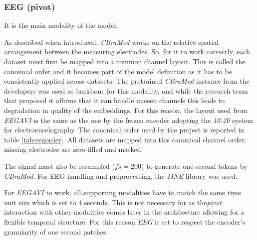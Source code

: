 \subsubsection{EEG (pivot)}
It is the main modality of the model.

As described when introduced, \textit{CBraMod} works on the relative spatial arrangement between the measuring electrodes.
So, for it to work correctly, each dataset must first be mapped into a common channel layout.
This is called the canonical order and it becomes part of the model definition as it has to be consistently applied across datasets.
The pretrained \textit{CBraMod} instance from the developers was used as backbone for this modality, and while the research team that proposed it affirms that it can handle unseen channels this leads to degradation in quality of the embeddings.
For this reason, the layout used from \textit{EEGAVI} is the same as the one by the frozen encoder adopting the \textit{10-20} system for electroencelography.
The canonical order used by the project is reported in table \ref{tab:eegorder}.
All datasets are mapped into this canonical channel order; missing electrodes are zero-filled and masked.

The signal must also be resampled ($fs=200$) to generate one-second tokens by \textit{CBraMod}.
For EEG handling and preprocessing, the \textit{MNE} \cite{} library was used.

For \textit{EEGAVI} to work, all supporting modalities have to match the same time unit size which is set to 4 seconds.
This is not necessary for  as the\textit{pivot} interaction with other modalities comes later in the architecture allowing for a flexible temporal structure.
For this reason \textit{EEG} is set to respect the encoder's granularity of one second patches.

